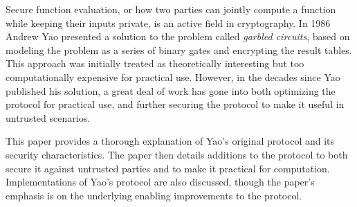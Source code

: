 Secure function evaluation, or how two parties can jointly compute a function while keeping their inputs private, is an active field in cryptography. In 1986 Andrew Yao presented a solution to the problem called \emph{garbled circuits}, based on modeling the problem as a series of binary gates and encrypting the result tables. This approach was initially treated as theoretically interesting but too computationally expensive for practical use.  However, in the decades since Yao published his solution, a great deal of work has gone into both optimizing the protocol for practical use, and further securing the protocol to make it useful in untrusted scenarios.

This paper provides a thorough explanation of Yao's original protocol and its security characteristics.  The paper then details additions to the protocol to both secure it against untrusted parties and to make it practical for computation.  Implementations of Yao's protocol are also discussed, though the paper's emphasis is on the underlying enabling improvements to the protocol.

